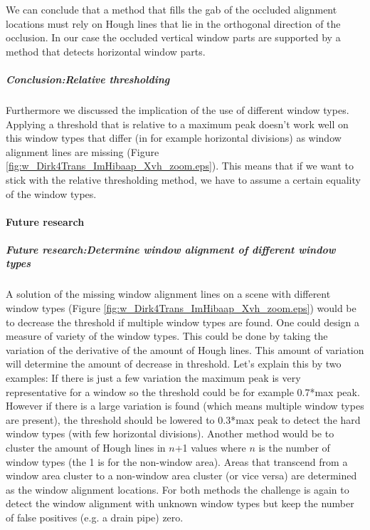 We can conclude that a method that fills the gab of the occluded alignment locations
must rely on Hough lines that lie in the orthogonal direction of the occlusion.
In our case the occluded vertical window parts are supported by a method that
detects horizontal window parts.

\subparagraph{Conclusion:Relative thresholding}
Furthermore we discussed the implication of the use of different window types.
Applying a threshold that is relative to a maximum peak doesn't work well on
this window types that differ (in for example horizontal divisions) as window
alignment lines are missing (Figure
\ref{fig:w_Dirk4Trans_ImHibaap_Xvh_zoom.eps}).  This means that if we want to
stick with the relative thresholding method, we have to assume a certain
equality of the window types. 




\paragraph{Future research}
\subparagraph{Future research:Determine window alignment of different window types}
A solution of the missing window alignment lines on a scene with different
window types (Figure \ref{fig:w_Dirk4Trans_ImHibaap_Xvh_zoom.eps}) would be to
decrease the threshold if multiple window types are found. One could design a
measure of variety of the window types. This could be done by taking the variation of the
derivative of the amount of Hough lines. This amount of variation will determine
the amount of decrease in threshold. Let's explain this by two examples:
If there is just a few variation the maximum peak is very representative for a
window so the threshold could be for example 0.7*max peak. However if there is a
large variation is found (which means multiple window types are present), the
threshold should be lowered to 0.3*max peak to detect the hard window types
(with few horizontal divisions).
Another method would be to cluster the amount of Hough lines in $n$+1 values
where $n$ is the number of window types (the 1 is for the non-window area).
Areas that transcend from a window area cluster to a non-window area cluster
(or vice versa) are determined as the window alignment locations.
For both methods the challenge is again to detect the window alignment with
unknown window types but keep the number of false positives (e.g. a drain pipe)
zero.

